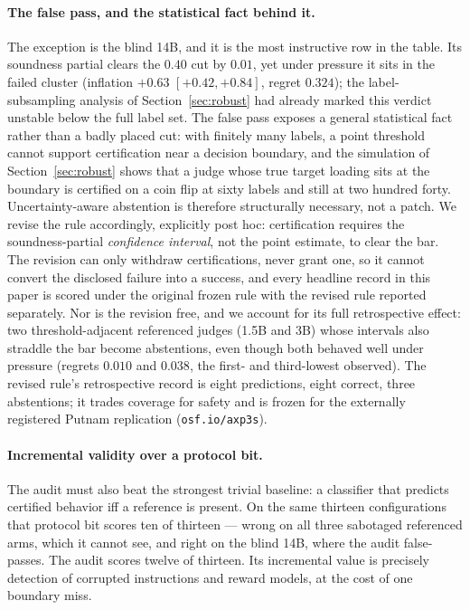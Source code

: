 \documentclass[11pt]{article}
\begin{document}
\paragraph{The false pass, and the statistical fact behind it.}
The exception is the blind 14B, and it is the most instructive row in the table.
Its soundness partial clears the $0.40$ cut by $0.01$, yet under pressure it sits in the failed cluster (inflation $+0.63$ $[+0.42, +0.84]$, regret $0.324$); the label-subsampling analysis of Section~\ref{sec:robust} had already marked this verdict unstable below the full label set.
The false pass exposes a general statistical fact rather than a badly placed cut: with finitely many labels, a point threshold cannot support certification near a decision boundary, and the simulation of Section~\ref{sec:robust} shows that a judge whose true target loading sits at the boundary is certified on a coin flip at sixty labels and still at two hundred forty.
Uncertainty-aware abstention is therefore structurally necessary, not a patch.
We revise the rule accordingly, explicitly post hoc: certification requires the soundness-partial \emph{confidence interval}, not the point estimate, to clear the bar.
The revision can only withdraw certifications, never grant one, so it cannot convert the disclosed failure into a success, and every headline record in this paper is scored under the original frozen rule with the revised rule reported separately.
Nor is the revision free, and we account for its full retrospective effect: two threshold-adjacent referenced judges (1.5B and 3B) whose intervals also straddle the bar become abstentions, even though both behaved well under pressure (regrets $0.010$ and $0.038$, the first- and third-lowest observed).
The revised rule's retrospective record is eight predictions, eight correct, three abstentions; it trades coverage for safety and is frozen for the externally registered Putnam replication (\texttt{osf.io/axp3s}).

\paragraph{Incremental validity over a protocol bit.}
The audit must also beat the strongest trivial baseline: a classifier that predicts certified behavior iff a reference is present.
On the same thirteen configurations that protocol bit scores ten of thirteen --- wrong on all three sabotaged referenced arms, which it cannot see, and right on the blind 14B, where the audit false-passes.
The audit scores twelve of thirteen.
Its incremental value is precisely detection of corrupted instructions and reward models, at the cost of one boundary miss.
\end{document}
